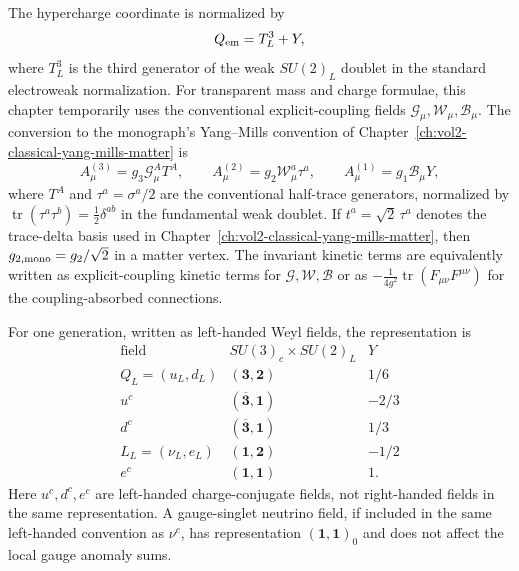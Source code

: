\begin{convention}
\label{conv:sm-electroweak-trace-normalization}
The hypercharge coordinate is normalized by
\[
  Q_{\rm em}=T^3_L+Y ,
\]
where \(T^3_L\) is the third generator of the weak \(SU(2)_L\) doublet in the
standard electroweak normalization.  For transparent mass and charge formulae,
this chapter temporarily uses the conventional explicit-coupling fields
\(\mathcal G_\mu,\mathcal W_\mu,\mathcal B_\mu\).  The conversion to the
monograph's Yang--Mills convention of
Chapter~\ref{ch:vol2-classical-yang-mills-matter} is
\[
  A^{(3)}_\mu=g_3\mathcal G^A_\mu T^A,\qquad
  A^{(2)}_\mu=g_2\mathcal W^a_\mu \tau^a,\qquad
  A^{(1)}_\mu=g_1\mathcal B_\mu Y ,
\]
where \(T^A\) and \(\tau^a=\sigma^a/2\) are the conventional half-trace
generators, normalized by
\(\operatorname{tr}(\tau^a\tau^b)=\frac12\delta^{ab}\) in the fundamental
weak doublet.  If \(t^a=\sqrt2\,\tau^a\) denotes the trace-delta basis used in
Chapter~\ref{ch:vol2-classical-yang-mills-matter}, then
\(g_{2,\rm mono}=g_2/\sqrt2\) in a matter vertex.  The invariant kinetic
terms are equivalently written as explicit-coupling kinetic terms for
\(\mathcal G,\mathcal W,\mathcal B\) or as
\(-\frac1{4g^2}\operatorname{tr}(F_{\mu\nu}F^{\mu\nu})\) for the
coupling-absorbed connections.
\end{convention}

\begin{definition}
\label{def:sm-one-generation-left-weyl}
For one generation, written as left-handed Weyl fields, the representation is
\[
\begin{array}{c|c|c}
  \text{field} & SU(3)_c\times SU(2)_L & Y \\ \hline
  Q_L=(u_L,d_L) & (\mathbf 3,\mathbf 2) & 1/6\\
  u^c & (\overline{\mathbf 3},\mathbf 1) & -2/3\\
  d^c & (\overline{\mathbf 3},\mathbf 1) & 1/3\\
  L_L=(\nu_L,e_L) & (\mathbf 1,\mathbf 2) & -1/2\\
  e^c & (\mathbf 1,\mathbf 1) & 1 .
\end{array}
\]
Here \(u^c,d^c,e^c\) are left-handed charge-conjugate fields, not
right-handed fields in the same representation.  A gauge-singlet neutrino
field, if included in the same left-handed convention as \(\nu^c\), has
representation \((\mathbf1,\mathbf1)_0\) and does not affect the local gauge
anomaly sums.
\end{definition}

